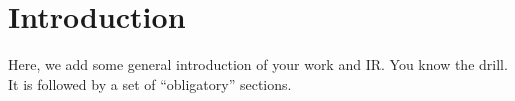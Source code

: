 
\chapter{Introduction}
\label{chapter:introduction}

Here, we add some general introduction of your work and \ac{IR}. You know the drill. It is followed by a set of ``obligatory'' sections. 







